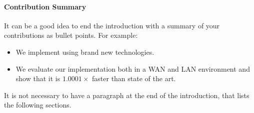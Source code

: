\paragraph{Contribution Summary} 
It can be a good idea to end the introduction with a summary of your contributions as bullet points.
For example:
\begin{itemize}
\item We implement \paxos using brand new technologies.
\item We evaluate our implementation both in a WAN and LAN environment and show that it is $1.0001\times$ faster than state of the art.
\end{itemize}
It is not necessary to have a paragraph at the end of the introduction, that lists the following sections. 
